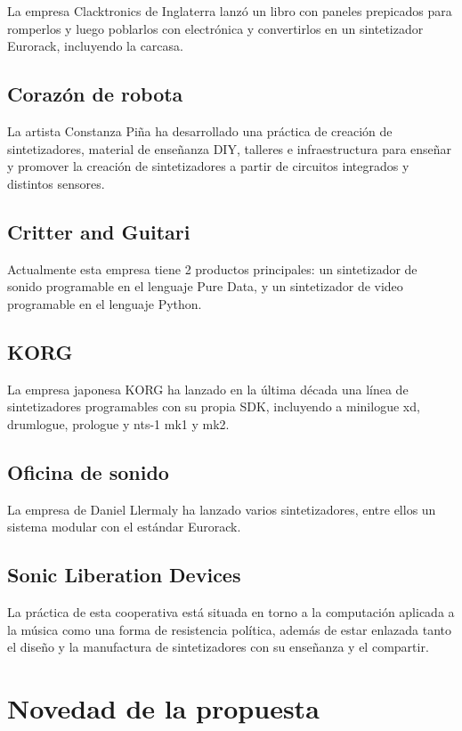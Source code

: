 \documentclass[../proyecto.tex]{subfiles}
\begin{document}
La empresa Clacktronics de Inglaterra lanzó un libro con paneles prepicados para romperlos y luego poblarlos con electrónica y convertirlos en un sintetizador Eurorack, incluyendo la carcasa.

\subsection{Corazón de robota}

La artista Constanza Piña ha desarrollado una práctica de creación de sintetizadores, material de enseñanza DIY, talleres e infraestructura para enseñar y promover la creación de sintetizadores a partir de circuitos integrados y distintos sensores.

\subsection{Critter and Guitari}

Actualmente esta empresa tiene 2 productos principales: un sintetizador de sonido programable en el lenguaje Pure Data, y un sintetizador de video programable en el lenguaje Python.

\subsection{KORG}

La empresa japonesa KORG ha lanzado en la última década una línea de sintetizadores programables con su propia SDK, incluyendo a minilogue xd, drumlogue, prologue y nts-1 mk1 y mk2.

\subsection{Oficina de sonido}

La empresa de Daniel Llermaly ha lanzado varios sintetizadores, entre ellos un sistema modular con el estándar Eurorack.

\subsection{Sonic Liberation Devices}

La práctica de esta cooperativa está situada en torno a la computación aplicada a la música como una forma de resistencia política, además de estar enlazada tanto el diseño y la manufactura de sintetizadores con su enseñanza y el compartir.

\section{Novedad de la propuesta}
\end{document}
